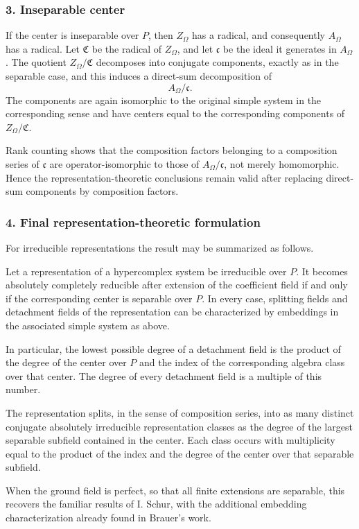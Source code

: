 \documentclass[
  11pt,
]{article}
\begin{document}
\subsubsection{3. Inseparable center}\label{inseparable-center}

If the center is inseparable over \(P\), then \(Z_\Omega\) has a
radical, and consequently \(A_\Omega\) has a radical. Let
\(\mathfrak C\) be the radical of \(Z_\Omega\), and let \(\mathfrak c\)
be the ideal it generates in \(A_\Omega\). The quotient
\(Z_\Omega/\mathfrak C\) decomposes into conjugate components, exactly
as in the separable case, and this induces a direct-sum decomposition of
\[
  A_\Omega/\mathfrak c.
\] The components are again isomorphic to the original simple system in
the corresponding sense and have centers equal to the corresponding
components of \(Z_\Omega/\mathfrak C\).

Rank counting shows that the composition factors belonging to a
composition series of \(\mathfrak c\) are operator-isomorphic to those
of \(A_\Omega/\mathfrak c\), not merely homomorphic. Hence the
representation-theoretic conclusions remain valid after replacing
direct-sum components by composition factors.

\subsubsection{4. Final representation-theoretic
formulation}\label{final-representation-theoretic-formulation}

For irreducible representations the result may be summarized as follows.

Let a representation of a hypercomplex system be irreducible over \(P\).
It becomes absolutely completely reducible after extension of the
coefficient field if and only if the corresponding center is separable
over \(P\). In every case, splitting fields and detachment fields of the
representation can be characterized by embeddings in the associated
simple system as above.

In particular, the lowest possible degree of a detachment field is the
product of the degree of the center over \(P\) and the index of the
corresponding algebra class over that center. The degree of every
detachment field is a multiple of this number.

The representation splits, in the sense of composition series, into as
many distinct conjugate absolutely irreducible representation classes as
the degree of the largest separable subfield contained in the center.
Each class occurs with multiplicity equal to the product of the index
and the degree of the center over that separable subfield.

When the ground field is perfect, so that all finite extensions are
separable, this recovers the familiar results of I. Schur, with the
additional embedding characterization already found in Brauer's work.
\end{document}

